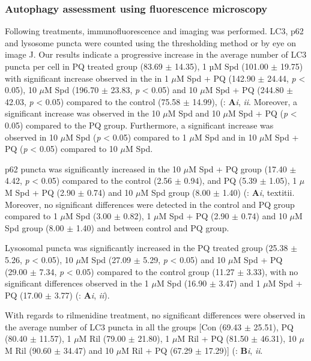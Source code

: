 \subsubsection{Autophagy assessment using fluorescence microscopy}
Following treatments, immunofluorescence and imaging was performed. LC3, p62 and lysosome puncta were counted using the thresholding method or by eye on image J. Our results indicate a progressive increase in the average number of LC3 puncta per cell in PQ treated group (83.69 $\pm$ 14.35), 1 µM Spd (101.00 $\pm$ 19.75) with significant increase observed in the in 1 $\mu$M Spd + PQ (142.90 $\pm$ 24.44, \textit{p} < 0.05), 10 $\mu$M Spd (196.70 $\pm$ 23.83, \textit{p} < 0.05) and 10 $\mu$M Spd + PQ (244.80 $\pm$ 42.03, \textit{p} < 0.05) compared to the control (75.58 $\pm$ 14.99), (: \textbf{A}\textit{i}, \textit{ii}. Moreover, a significant increase was observed in the 10 $\mu$M Spd and 10 $\mu$M Spd + PQ (\textit{p} < 0.05) compared to the PQ group. Furthermore, a significant increase was observed in 10 $\mu$M Spd (\textit{p} < 0.05) compared to 1 $\mu$M Spd  and in 10 $\mu$M Spd + PQ (\textit{p} < 0.05) compared to 10 $\mu$M Spd.


p62 puncta was significantly increased in the 10 $\mu$M Spd + PQ group (17.40 $\pm$ 4.42, \textit{p} < 0.05) compared to the control (2.56 $\pm$ 0.94), and PQ (5.39 $\pm$ 1.05), 1 $\mu$M Spd + PQ (2.90 $\pm$ 0.74) and 10 $\mu$M Spd group (8.00 $\pm$ 1.40) (: \textbf{A}\textit{i}, textit{ii}. Moreover, no significant differences were detected in the control and PQ group compared to 1 $\mu$M Spd (3.00 $\pm$ 0.82), 1 $\mu$M Spd + PQ (2.90 $\pm$ 0.74) and 10 $\mu$M Spd group (8.00 $\pm$ 1.40) and between control and PQ group.

Lysosomal puncta was significantly increased in the PQ treated group (25.38 $\pm$ 5.26, \textit{p} < 0.05), 10 $\mu$M Spd (27.09 $\pm$ 5.29, \textit{p} < 0.05) and 10 $\mu$M Spd + PQ (29.00 $\pm$ 7.34, \textit{p} < 0.05) compared to the control group (11.27 $\pm$ 3.33), with no significant differences observed in the 1 $\mu$M Spd (16.90 $\pm$ 3.47) and 1 $\mu$M Spd + PQ (17.00 $\pm$ 3.77) (: \textbf{A}\textit{i}, \textit{ii}).

With regards to rilmenidine treatment, no significant differences were observed in the average number of LC3 puncta in all the groups [Con (69.43 $\pm$ 25.51), PQ (80.40 $\pm$ 11.57), 1 $\mu$M Ril (79.00 $\pm$ 21.80), 1 $\mu$M Ril + PQ (81.50 $\pm$ 46.31), 10 $\mu$M Ril (90.60 $\pm$ 34.47) and 10 $\mu$M Ril + PQ (67.29 $\pm$ 17.29)] (: \textbf{B}\textit{i}, \textit{ii}.

